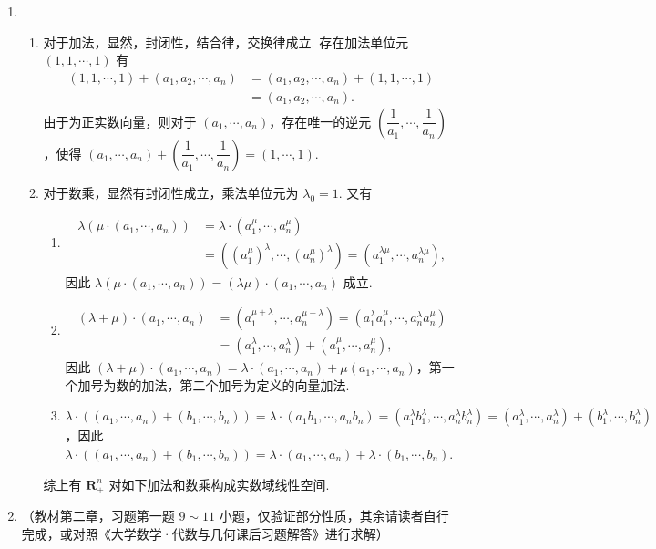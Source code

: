 \begin{enumerate}
\begin{enumerate}
        \item \begin{enumerate}
            \item 对于加法，显然，封闭性，结合律，交换律成立. 存在加法单位元 $(1,1,\cdots,1)$ 有
            \begin{align*}
                (1,1,\cdots,1)+(a_1,a_2,\cdots,a_n)&=(a_1,a_2,\cdots,a_n)+(1,1,\cdots,1)\\ &=(a_1,a_2,\cdots,a_n).
            \end{align*}
            由于为正实数向量，则对于 $(a_1,\cdots,a_n)$，存在唯一的逆元 $(\dfrac 1{a_1},\cdots,\dfrac 1{a_n})$，使得 $(a_1,\cdots,a_n)+(\dfrac 1{a_1},\cdots,\dfrac 1{a_n})=(1,\cdots,1)$.
            \item 对于数乘，显然有封闭性成立，乘法单位元为 $\lambda_0=1$. 又有
            \begin{enumerate}
                \item \begin{align*}
                    \lambda(\mu\cdot(a_1,\cdots,a_n))&=\lambda\cdot(a_1^\mu,\cdots,a_n^\mu)\\ &=((a_1^\mu)^\lambda,\cdots,(a_n^\mu)^\lambda)=(a_1^{\lambda\mu},\cdots,a_n^{\lambda\mu}),
                \end{align*}
                因此 $\lambda(\mu\cdot(a_1,\cdots,a_n))=(\lambda\mu)\cdot(a_1,\cdots,a_n)$ 成立.
                \item \begin{align*}
                    (\lambda+\mu)\cdot(a_1,\cdots,a_n)&=(a_1^{\mu+\lambda},\cdots,a_n^{\mu+\lambda})=(a_1^\lambda a_1^\mu,\cdots,a_n^\lambda a_n^\mu)\\&=(a_1^\lambda,\cdots,a_n^\lambda)+(a_1^\mu,\cdots,a_n^\mu),
                \end{align*}
                因此 $(\lambda+\mu)\cdot(a_1,\cdots,a_n)=\lambda\cdot(a_1,\cdots,a_n)+\mu(a_1,\cdots,a_n)$，第一个加号为数的加法，第二个加号为定义的向量加法.
                \item $\lambda\cdot((a_1,\cdots,a_n)+(b_1,\cdots,b_n))=\lambda\cdot(a_1b_1,\cdots,a_nb_n)=(a_1^\lambda b_1^\lambda,\cdots,a_n^\lambda b_n^\lambda)=(a_1^\lambda,\cdots,a_n^\lambda)+(b_1^\lambda,\cdots,b_n^\lambda)$，因此 $\lambda\cdot((a_1,\cdots,a_n)+(b_1,\cdots,b_n))=\lambda\cdot(a_1,\cdots,a_n)+\lambda\cdot(b_1,\cdots,b_n)$.
            \end{enumerate}
            综上有 $\mathbf{R}_+^n$ 对如下加法和数乘构成实数域线性空间.
        \end{enumerate}
        \item （教材第二章，习题第一题 $9\sim 11$ 小题，仅验证部分性质，其余请读者自行完成，或对照《大学数学·代数与几何课后习题解答》进行求解）


\end{enumerate}
\end{enumerate}
